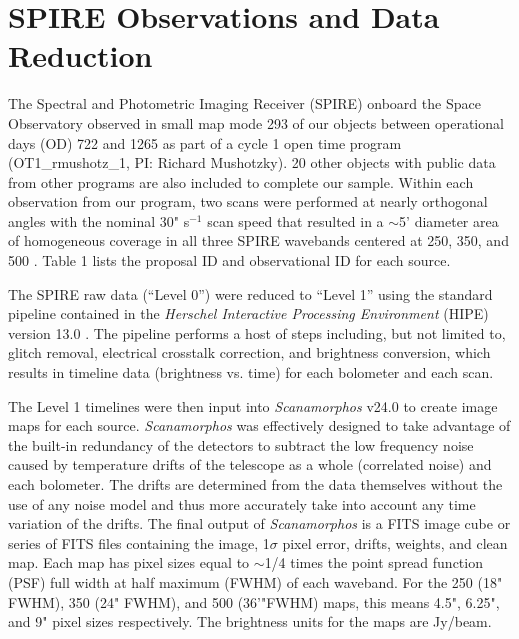 \section{\herschel{} SPIRE Observations and Data Reduction}\label{obs}
The Spectral and Photometric Imaging Receiver (SPIRE) \citep{Griffin:2010sf} onboard the \herschel{} Space Observatory \citep{Pilbratt:2010rz} observed in small map mode 293 of our objects between operational days (OD) 722 and 1265 as part of a cycle 1 open time program (OT1\_rmushotz\_1, PI: Richard Mushotzky). 20 other objects with public data from other programs are also included to complete our sample. Within each observation from our program, two scans were performed at nearly orthogonal angles with the nominal 30" s$^{-1}$ scan speed that resulted in a $\sim$5' diameter area of homogeneous coverage in all three SPIRE wavebands centered at 250, 350, and 500 \um. Table 1 lists the proposal ID and observational ID for each source.

The SPIRE raw data (``Level 0'') were reduced to ``Level 1'' using the standard pipeline contained in the \textit{Herschel Interactive Processing Environment} (HIPE) version 13.0 \citep{Ott:2010rm}. The pipeline performs a host of steps including, but not limited to, glitch removal, electrical crosstalk correction, and brightness conversion, which results in timeline data (brightness vs. time) for each bolometer and each scan. 

The Level 1 timelines were then input into \textit{Scanamorphos} v24.0 \citep{Roussel:2013gf} to create image maps for each source. \textit{Scanamorphos} was effectively designed to take advantage of the built-in redundancy of the detectors to subtract the low frequency noise caused by temperature drifts of the telescope as a whole (correlated noise) and each bolometer. The drifts are determined from the data themselves without the use of any noise model and thus more accurately take into account any time variation of the drifts. The final output of \textit{Scanamorphos} is a FITS image cube or series of FITS files containing the image, 1$\sigma$ pixel error, drifts, weights, and clean map. Each map has pixel sizes equal to $ \sim$1/4 times the point spread function (PSF) full width at half maximum (FWHM) of each waveband. For the 250 (18" FWHM), 350 (24" FWHM), and 500 \um{} (36'"FWHM) maps, this means 4.5", 6.25", and 9" pixel sizes respectively. The brightness units for the maps are Jy/beam.
  